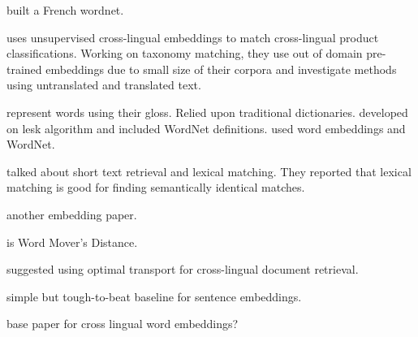\textcite{sagot_building_2008} built a French wordnet.

\textcite{gordeev_unsupervised_2018} uses unsupervised cross-lingual embeddings to match cross-lingual product classifications.
Working on taxonomy matching, they use out of domain pre-trained embeddings due to small size of their corpora and investigate methods using untranslated and translated text.

\textcite{lesk_automatic_1986} represent words using their gloss.
Relied upon traditional dictionaries.
\textcite{banerjee_adapted_2002} developed on lesk algorithm and included WordNet definitions.
\textcite{khodak_automated_2017} used word embeddings and WordNet.

\textcite{metzler_similarity_2007} talked about short text retrieval and lexical matching.
They reported that lexical matching is good for finding semantically identical matches.

\textcite{xiao_distributed_2014} another embedding paper.

\textcite{kusner_word_2015} is Word Mover's Distance.

\textcite{balikas_cross-lingual_2018} suggested using optimal transport for cross-lingual document retrieval.

\textcite{arora_simple_2016} simple but tough-to-beat baseline for sentence embeddings.

\textcite{klementiev_inducing_2012} base paper for cross lingual word embeddings?
